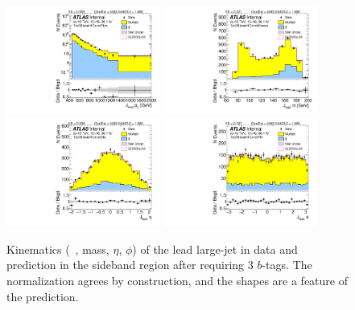 \clearpage

\begin{figure}[htbp!]
\begin{center}
\includegraphics[width=0.45\textwidth,angle=-90]{figures/boosted/Sideband/b77_ThreeTag_Sideband_leadHCand_Pt_m_1.pdf}
\includegraphics[width=0.45\textwidth,angle=-90]{figures/boosted/Sideband/b77_ThreeTag_Sideband_leadHCand_Mass_s.pdf}\\
\includegraphics[width=0.45\textwidth,angle=-90]{figures/boosted/Sideband/b77_ThreeTag_Sideband_leadHCand_Eta.pdf}
\includegraphics[width=0.45\textwidth,angle=-90]{figures/boosted/Sideband/b77_ThreeTag_Sideband_leadHCand_Phi.pdf}
  \caption{Kinematics (\pt~, mass, $\eta$, $\phi$) of the lead large-\R jet in data and prediction in the sideband region after requiring 3 $b$-tags. The normalization agrees by construction, and the shapes are a feature of the prediction.}
  \label{fig:boosted-3b-sideband-ak10-lead}
\end{center}
\end{figure}

